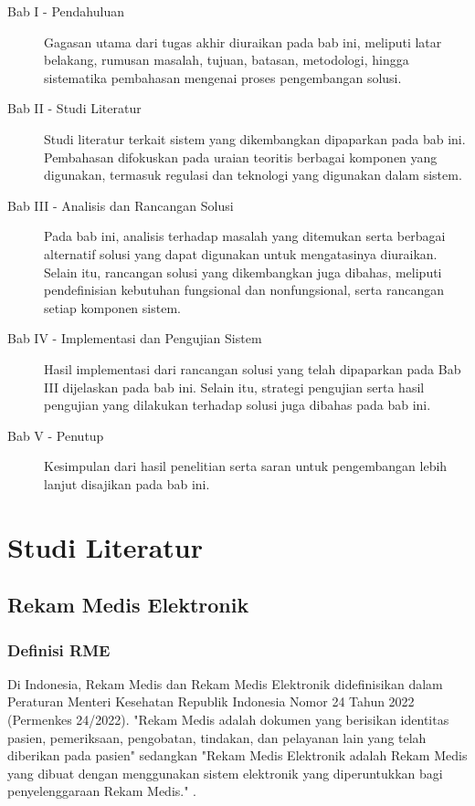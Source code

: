 \documentclass[bahasa, 12pt, a4paper, onecolumn, oneside, final]{report}
\begin{document}
\begin{description}
	\item[Bab I - Pendahuluan]
	      Gagasan utama dari tugas akhir diuraikan pada bab ini, meliputi latar belakang, rumusan masalah, tujuan, batasan, metodologi, hingga sistematika pembahasan mengenai proses pengembangan solusi.

	\item[Bab II - Studi Literatur]
	      Studi literatur terkait sistem yang dikembangkan dipaparkan pada bab ini. Pembahasan difokuskan pada uraian teoritis berbagai komponen yang digunakan, termasuk regulasi dan teknologi yang digunakan dalam sistem.

	\item[Bab III - Analisis dan Rancangan Solusi]
	      Pada bab ini, analisis terhadap masalah yang ditemukan serta berbagai alternatif solusi yang dapat digunakan untuk mengatasinya diuraikan. Selain itu, rancangan solusi yang dikembangkan juga dibahas, meliputi pendefinisian kebutuhan fungsional dan nonfungsional, serta rancangan setiap komponen sistem.

	\item[Bab IV - Implementasi dan Pengujian Sistem]
	      Hasil implementasi dari rancangan solusi yang telah dipaparkan pada Bab III dijelaskan pada bab ini. Selain itu, strategi pengujian serta hasil pengujian yang dilakukan terhadap solusi juga dibahas pada bab ini.

	\item[Bab V - Penutup]
	      Kesimpulan dari hasil penelitian serta saran untuk pengembangan lebih lanjut disajikan pada bab ini.
\end{description}
\chapter{Studi Literatur}
\label{chapter:studi-literatur}

\section{Rekam Medis Elektronik}

\subsection{Definisi RME}
\label{subsec:definisi-rme}

Di Indonesia, Rekam Medis dan Rekam Medis Elektronik didefinisikan dalam Peraturan Menteri Kesehatan Republik Indonesia Nomor 24 Tahun 2022 (Permenkes 24/2022). "Rekam Medis adalah dokumen yang berisikan identitas pasien, pemeriksaan, pengobatan, tindakan, dan pelayanan lain yang telah diberikan pada pasien" sedangkan "Rekam Medis Elektronik adalah Rekam Medis yang dibuat dengan menggunakan sistem elektronik yang diperuntukkan bagi penyelenggaraan Rekam Medis." \autocite{permenkes24_2022}.
\end{document}
